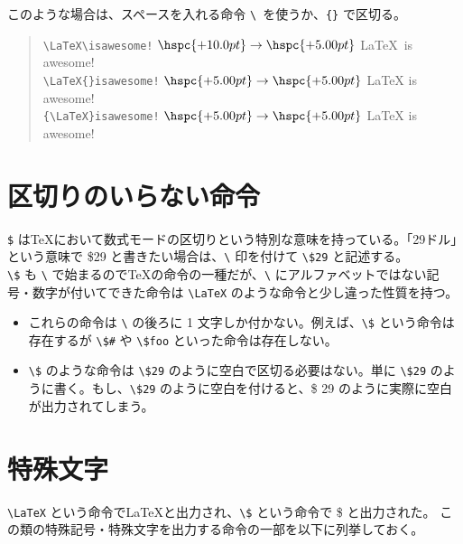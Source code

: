 このような場合は、スペースを入れる命令 \verb'\'\textvisiblespace\ を使うか、\verb'{}' で区切る。\enlargethispage{+2.00zw}
\begin{quote}
  \verb'\LaTeX\'\textvisiblespace\verb'is'\textvisiblespace\verb'awesome!'  $\hspc{+10.0pt}\rightarrow\hspc{+5.00pt}$ \LaTeX\  is awesome! \\
  \verb'\LaTeX{}'\textvisiblespace\verb'is'\textvisiblespace\verb'awesome!' $\hspc{+5.00pt}\rightarrow\hspc{+5.00pt}$ \LaTeX{} is awesome! \\
  \verb'{\LaTeX}'\textvisiblespace\verb'is'\textvisiblespace\verb'awesome!' $\hspc{+5.00pt}\rightarrow\hspc{+5.00pt}$ {\LaTeX} is awesome! \\
\end{quote}
\section{区切りのいらない命令}
\verb'$' は\TeX{}において数式モードの区切りという特別な意味を持っている。「29ドル」という意味で \$29 と書きたい場合は、\verb'\' 印を付けて \verb'\$29' と記述する。\\

\verb'\$' も \verb'\' で始まるので\TeX{}の命令の一種だが、\verb'\' にアルファベットではない記号・数字が付いてできた命令は \verb'\LaTeX' のような命令と少し違った性質を持つ。
\begin{itemize}\setlength{\leftskip}{-1.00zw}%
\item これらの命令は \verb'\' の後ろに 1 文字しか付かない。例えば、\verb'\$' という命令は存在するが \verb'\$#' や \verb'\$foo' といった命令は存在しない。
\item \verb'\$' のような命令は \verb'\$'\textvisiblespace\verb'29' のように空白で区切る必要はない。単に \verb'\$29' のように書く。もし、\verb'\$'\textvisiblespace\verb'29' のように空白を付けると、\$ 29 のように実際に空白が出力されてしまう。
\end{itemize}
\section{特殊文字}
\verb'\LaTeX' という命令で\LaTeX{}と出力され、\verb'\$' という命令で \$ と出力された。
この類の特殊記号・特殊文字を出力する命令の一部を以下に列挙しておく。\\

